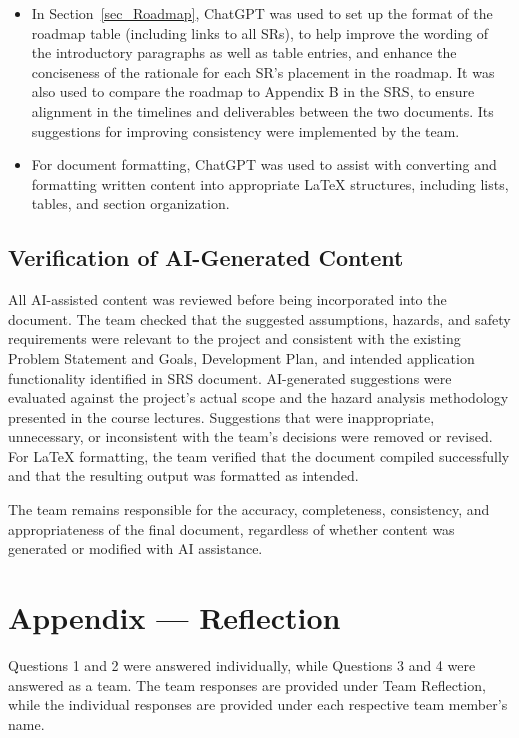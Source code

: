 \documentclass{article}
\newcounter{hazard}
\begin{document}
\begin{itemize}
  \item In Section~\ref{sec_Roadmap}, ChatGPT was used to set up the format of the roadmap table (including links to all SRs), to help improve the wording of the introductory paragraphs as well as table entries,
  and enhance the conciseness of the rationale for each SR's placement in the roadmap. It was also used to compare the roadmap to Appendix B in the SRS, to ensure alignment in the timelines
  and deliverables between the two documents. Its suggestions for improving consistency were implemented by the team.

  \item For document formatting,
  ChatGPT was used to assist with converting and formatting
  written content into appropriate \LaTeX{} structures,
  including lists, tables, and section organization.
\end{itemize}

\subsection{Verification of AI-Generated Content}

All AI-assisted content was reviewed before being incorporated into the
document. The team checked that the suggested assumptions, hazards, and safety
requirements were relevant to the project and consistent with the existing
Problem Statement and Goals, Development Plan, and intended application
functionality identified in SRS document. AI-generated suggestions were
evaluated against the project's actual scope and the hazard analysis
methodology presented in the course lectures. Suggestions that were
inappropriate, unnecessary, or inconsistent with the team's decisions were
removed or revised. For \LaTeX{} formatting, the team verified that the
document compiled successfully and that the resulting output was formatted as
intended.

The team remains responsible for the accuracy, completeness,
consistency, and appropriateness of the final document, regardless of whether
content was generated or modified with AI assistance.

\newpage{}

\section{Appendix --- Reflection}
Questions 1 and 2 were answered individually, while Questions 3 and 4 were
answered as a team. The team responses are provided under Team Reflection,
while the individual responses are provided under each respective team
member's name.
\end{document}

